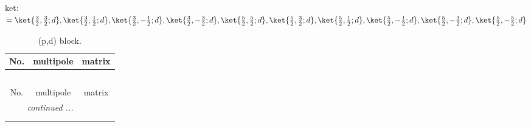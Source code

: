 \documentclass[fleqn,8pt,landscape]{jsarticle}
\begin{document}
\noindent
ket: $=\ket{\frac{3}{2},\frac{3}{2};d}, \ket{\frac{3}{2},\frac{1}{2};d}, \ket{\frac{3}{2},- \frac{1}{2};d}, \ket{\frac{3}{2},- \frac{3}{2};d}, \ket{\frac{5}{2},\frac{5}{2};d}, \ket{\frac{5}{2},\frac{3}{2};d}, \ket{\frac{5}{2},\frac{1}{2};d}, \ket{\frac{5}{2},- \frac{1}{2};d}, \ket{\frac{5}{2},- \frac{3}{2};d}, \ket{\frac{5}{2},- \frac{5}{2};d}$
\renewcommand{\arraystretch}{1.6}
\begin{longtable}{ccc}
\caption{(p,d) block.}
 \\
 \hline \hline
No. & multipole & matrix \\ \hline \endfirsthead

\multicolumn{2}{l}{\tablename\ \thetable{}} \\
 \hline \hline
No. & multipole & matrix \\ \hline \endhead

 \hline \hline
\multicolumn{2}{r}{\footnotesize\it continued ...} \\ \endfoot

 \hline \hline
\multicolumn{2}{r}{} \\ \endlastfoot


\end{longtable}
\end{document}
